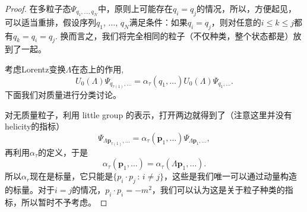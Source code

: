 \documentclass[11pt]{article}
\theoremstyle{definition}
\theoremstyle{plain}
\newtheorem{pro}[para]{Proposition}
\begin{document}
\begin{proof}
在多粒子态$\Psi_{q_1,\dots,q_N}$中，原则上可能存在$q_i=q_j$的情况，所以，方便起见，可以适当重排，假设序列$q_1$, $\dots$, $q_N$满足条件：如果$q_i=q_j$，则对任意的$i\leq k\leq j$都有$q_k=q_i=q_j$. 换而言之，我们将完全相同的粒子（不仅种类，整个状态都是）放到了一起。

考虑Lorentz变换$\Lambda$在态上的作用,
\[
	U_0(\Lambda)\Psi_{q_{\tau(1)},\dots}=\alpha_\tau(q_1,\dots)U_0(\Lambda)\Psi_{q_1,\dots}.
\]
下面我们对质量进行分类讨论。

对无质量粒子，利用 little group 的表示，打开两边就得到了（注意这里并没有helicity的指标）
\[
	\Psi_{\Lambda \bm{p}_{\tau(1)},\dots}=\alpha_\tau(\bm{p}_1,\dots)\Psi_{\Lambda \bm{p}_1,\dots},
\]
再利用$\alpha_\tau$的定义，于是
\[
	\alpha_\tau(\bm{p}_1,\dots)=\alpha_\tau(\Lambda \bm{p}_1,\dots).
\]
所以$\alpha_r$现在是标量，它只能是$\{p_i\cdot p_j\,:\, i\neq j\}$，这些是我们唯一可以通过动量构造的标量。对于$i=j$的情况，$p_i\cdot p_i=-m^2$，我们可以认为这是关于粒子种类的指标，所以暂时不予考虑。







\end{proof}
\end{document}
